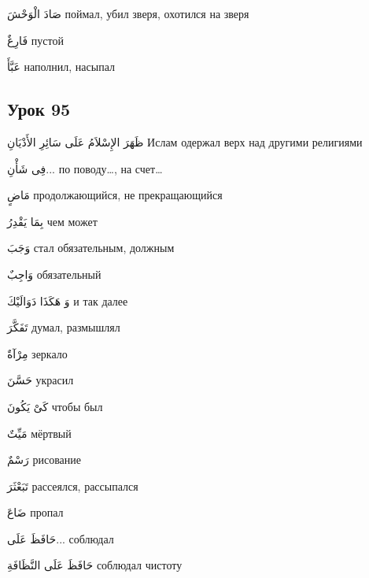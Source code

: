 \documentclass[a5paper]{article}
\newcommand\textstyleDropCaps[1]{#1}
\newcommand\textstyleCaptioncharacters[1]{#1}
\begin{document}
\textstyleCaptioncharacters{صَادَ الْوَحْشَ }\textstyleDropCaps{поймал, убил зверя, охотился на зверя‎}

\textstyleCaptioncharacters{فَارِغٌ }\textstyleDropCaps{пустой‎}

\textstyleCaptioncharacters{عَبَّأَ }\textstyleDropCaps{наполнил, насыпал‎}

\subsection[Урок 95‎]{\textstyleDropCaps{Урок 95‎}}
\textstyleCaptioncharacters{ظَهَرَ الإِسْلاَمُ عَلَى سَائِرِ الأَدْيَانِ }\textstyleDropCaps{Ислам одержал верх над другими религиями ‎}

\textstyleCaptioncharacters{فِى شَأْنِ... }\textstyleDropCaps{по поводу…, на счет…‎}

\textstyleCaptioncharacters{مَاضٍ }\textstyleDropCaps{продолжающийся, не прекращающийся‎}

\textstyleCaptioncharacters{بِمَا يَقْدِرُ }\textstyleDropCaps{чем может‎}

\textstyleCaptioncharacters{وَجَبَ }\textstyleDropCaps{стал обязательным, должным‎}

\textstyleCaptioncharacters{وَاجِبٌ }\textstyleDropCaps{обязательный‎}

\textstyleCaptioncharacters{وَ هَكَذَا دَوَالَيْكَ }\textstyleDropCaps{и так да­лее‎}

\textstyleCaptioncharacters{تَفَكَّرَ }\textstyleDropCaps{думал, размышлял‎}

\textstyleCaptioncharacters{مِرْآةٌ }\textstyleDropCaps{зеркало‎}

\textstyleCaptioncharacters{حَسَّنَ }\textstyleDropCaps{украсил‎}

\textstyleCaptioncharacters{كَىْ يَكُونَ }\textstyleDropCaps{чтобы был‎}

\textstyleCaptioncharacters{مَيِّتٌ }\textstyleDropCaps{мёртвый‎}

\textstyleCaptioncharacters{رَسْمٌ }\textstyleDropCaps{рисование‎}

\textstyleCaptioncharacters{تَبَعْثَرَ }\textstyleDropCaps{рассеялся, рассы­пался‎}

\textstyleCaptioncharacters{ضَاعَ }\textstyleDropCaps{пропал‎}

\textstyleCaptioncharacters{حَافَظَ عَلَى... }\textstyleDropCaps{соблюдал‎}

\textstyleCaptioncharacters{حَافَظَ عَلَى النَّظَافَةِ }\textstyleDropCaps{соблюдал чистоту‎}
\end{document}
